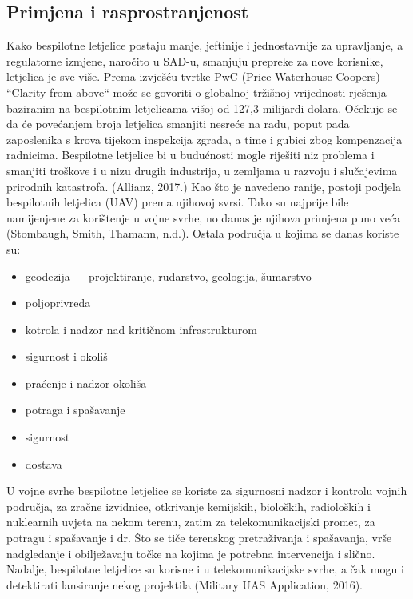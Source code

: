 \documentclass[times, utf8, diplomski]{fer}
\begin{document}
\subsection{Primjena i rasprostranjenost}
Kako bespilotne  letjelice  postaju  manje,  jeftinije  i  jednostavnije za  upravljanje,  a regulatorne izmjene, naročito u SAD-u, smanjuju prepreke za nove korisnike, letjelica je sve više. 
Prema izvješću tvrtke PwC (Price Waterhouse Coopers) “Clarity from above“ može se govoriti o globalnoj tržišnoj vrijednosti rješenja baziranim na bespilotnim letjelicama višoj od 127,3 milijardi dolara.
Očekuje se da će povećanjem broja letjelica smanjiti nesreće na radu, 
poput pada zaposlenika s krova tijekom inspekcija zgrada, a time i gubici zbog kompenzacija 
radnicima. 
Bespilotne letjelice bi u budućnosti mogle riješiti niz problema i smanjiti troškove i u nizu drugih industrija, u zemljama u razvoju i slučajevima prirodnih katastrofa. (Allianz, 2017.)
Kao što je navedeno ranije, postoji podjela bespilotnih letjelica (UAV) prema njihovoj svrsi. Tako  su  najprije  bile  namijenjene za korištenje u vojne svrhe, no danas je njihova primjena puno veća (Stombaugh, Smith, Thamann, n.d.). Ostala područja u kojima se danas koriste su:\begin{itemize}
\item geodezija --- projektiranje, rudarstvo, geologija, šumarstvo
\item poljoprivreda
\item kotrola i nadzor nad kritičnom infrastrukturom
\item sigurnost i okoliš
\item praćenje i nadzor okoliša
\item potraga i spašavanje
\item sigurnost
\item dostava
\end{itemize}
U  vojne  svrhe bespilotne  letjelice  se  koriste  za  sigurnosni  nadzor  i  kontrolu  vojnih područja, za zračne izvidnice, otkrivanje kemijskih, bioloških, radioloških i nuklearnih uvjeta na nekom terenu, zatim za telekomunikacijski promet, za potragu i spašavanje i dr. Što se tiče terenskog  pretraživanja  i  spašavanja,  vrše  nadgledanje  i  obilježavaju  točke  na  kojima  je potrebna intervencija i slično. Nadalje, bespilotne letjelice  su  korisne  i  u  telekomunikacijske svrhe, a čak mogu i detektirati lansiranje nekog projektila (Military UAS Application, 2016).\\
\end{document}
